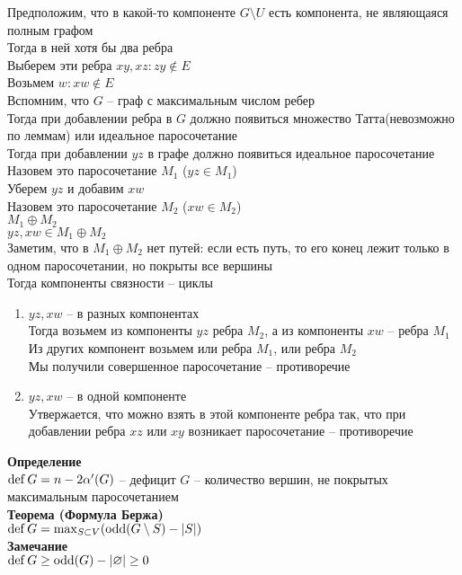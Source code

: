 \documentclass[12pt]{article}
\begin{document}
Предположим, что в какой-то компоненте $G \setminus U$ есть компонента, не являющаяся полным графом\\
Тогда в ней хотя бы два ребра\\
Выберем эти ребра $xy, xz: zy \not\in E$\\
Возьмем $w: xw \not\in E$\\
Вспомним, что $G$ -- граф с максимальным числом ребер\\
Тогда при добавлении ребра в $G$ должно появиться множество Татта(невозможно по леммам) или идеальное паросочетание\\
Тогда при добавлении $yz$ в графе должно появиться идеальное паросочетание\\
Назовем это паросочетание $M_1$ ($yz \in M_1$)\\
Уберем $yz$ и добавим $xw$\\
Назовем это паросочетание $M_2$ ($xw \in M_2$)\\
$M_1 \oplus M_2$\\
$yz, xw \in M_1\oplus M_2$\\
Заметим, что в $M_1\oplus M_2$ нет путей: если есть путь, то его конец лежит только в одном паросочетании, но покрыты все вершины\\
Тогда компоненты связности -- циклы
\begin{enumerate}
    \item $yz, xw$ -- в разных компонентах\\
    Тогда возьмем из компоненты $yz$ ребра $M_2$, а из компоненты $xw$ -- ребра $M_1$\\
    Из других компонент возьмем или ребра $M_1$, или ребра $M_2$\\
    Мы получили совершенное паросочетание -- противоречие
    \item $yz, xw$ -- в одной компоненте\\
    Утвержается, что можно взять в этой компоненте ребра так, что при добавлении ребра $xz$ или $xy$ возникает паросочетание -- противоречие
\end{enumerate}
\textbf{Определение}\\
$\operatorname{def} G = n - 2\alpha'(G)$ -- дефицит $G$ -- количество вершин, не покрытых максимальным паросочетанием\\
\textbf{Теорема (Формула Бержа)}\\
$\operatorname{def} G = \max_{S\subset V} (\operatorname{odd}(G\setminus S) - |S|)$\\
\textbf{Замечание}\\
$\operatorname{def} G \geq \operatorname{odd}(G) - |\varnothing| \geq 0$\\
\end{document}
